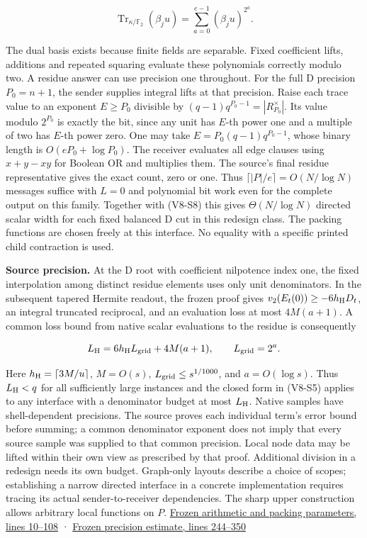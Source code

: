 \documentclass[11pt,a4paper]{article}
\begin{document}
\[
       \operatorname{Tr}_{\kappa/\mathbb F_2}(\beta_j u)
             =\sum_{a=0}^{e-1}(\beta_j u)^{2^a}.
\]

The dual basis exists because finite fields are separable. Fixed
coefficient lifts, additions and repeated squaring evaluate these
polynomials correctly modulo two. A residue answer can use precision one
throughout. For the full D precision \(P_0=n+1\), the sender supplies
integral lifts at that precision. Raise each trace value to an exponent
\(E\ge P_0\) divisible by \((q-1)q^{P_0-1}=|R_{P_0}^{\times}|\). Its
value modulo \(2^{P_0}\) is exactly the bit, since any unit has \(E\)-th
power one and a multiple of two has \(E\)-th power zero. One may take
\(E=P_0(q-1)q^{P_0-1}\), whose binary length is \(O(eP_0+\log P_0)\).
The receiver evaluates all edge clauses using \(x+y-xy\) for Boolean OR
and multiplies them. The source's final residue representative gives the
exact count, zero or one. Thus \(\lceil |P|/e\rceil=O(N/\log N)\)
messages suffice with \(L=0\) and polynomial bit work even for the
complete output on this family. Together with (V8-S8) this gives
\(\Theta(N/\log N)\) directed scalar width for each fixed balanced D cut
in this redesign class. The packing functions are chosen freely at this
interface. No equality with a specific printed child contraction is
used.

\textbf{Source precision.} At the D root with coefficient nilpotence
index one, the fixed interpolation among distinct residue elements uses
only unit denominators. In the subsequent tapered Hermite readout, the
frozen proof gives \(v_2(E_t(0))\ge-6h_{\rm H}D_t\), an integral
truncated reciprocal, and an evaluation loss at most \(4M(a+1)\). A
common loss bound from native scalar evaluations to the residue is
consequently

\[
       L_{\rm H}=6h_{\rm H}L_{\rm grid}+4M(a+1),\qquad L_{\rm grid}=2^a .
\]

Here \(h_{\rm H}=\lceil3M/u\rceil\), \(M=O(s)\),
\(L_{\rm grid}\le s^{1/1000}\), and \(a=O(\log s)\). Thus
\(L_{\rm H}<q\) for all sufficiently large instances and the closed form
in (V8-S5) applies to any interface with a denominator budget at most
\(L_{\rm H}\). Native samples have shell-dependent precisions. The
source proves each individual term's error bound before summing; a
common denominator exponent does not imply that every source sample was
supplied to that common precision. Local node data may be lifted within
their own view as prescribed by that proof. Additional division in a
redesign needs its own budget. Graph-only layouts describe a choice of
scopes; establishing a narrow directed interface in a concrete
implementation requires tracing its actual sender-to-receiver
dependencies. The sharp upper construction allows arbitrary local
functions on \(P\).
\href{https://github.com/openai/math/blob/main/preprints/The-Exponential-Time-Hypothesis-is-False-October-25-2026/build/quantitative-contraction.tex\#L10-L108}{Frozen
arithmetic and packing parameters, lines 10--108} ·
\href{https://github.com/openai/math/blob/main/preprints/The-Exponential-Time-Hypothesis-is-False-October-25-2026/build/quantitative-contraction.tex\#L244-L350}{Frozen
precision estimate, lines 244--350}
\end{document}
